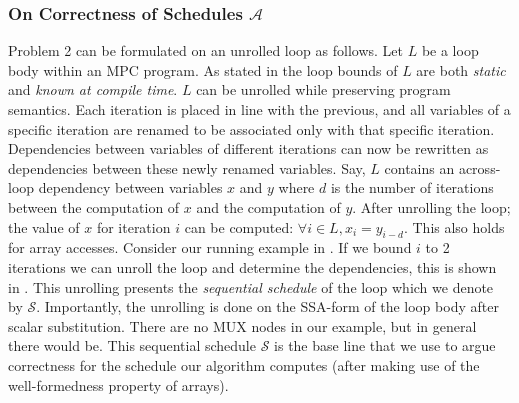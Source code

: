 \subsubsection{On Correctness of Schedules $\mathcal{A}$}

Problem 2 can be formulated on an unrolled loop as follows. 
Let $L$ be a loop body within an MPC program. %
As stated in  the loop bounds of $L$ are both \emph{static} and \emph{known at compile time}. 
$L$ can be unrolled while preserving program semantics. Each iteration is placed in line with
 the previous, and all variables of a specific iteration are renamed to be associated
only with that specific iteration. Dependencies between variables of different iterations can now be rewritten 
as dependencies between these newly renamed variables. Say, $L$ contains an 
across-loop dependency between variables $x$ and $y$ where $d$ is the number of iterations between 
the computation of $x$ and the computation of $y$. After unrolling the loop; the value of $x$ for 
iteration $i$ can be computed: $\forall i \in L, x_{i} = y_{i - d}$. This also holds for array 
accesses. 
Consider our running example in . 
If we bound $i$ to 2 iterations we can unroll the loop and determine the dependencies, this is shown
in . This unrolling presents the \emph{sequential schedule} of the loop which we denote by  $\mathcal{S}$.
Importantly, the unrolling is done on the SSA-form of the loop body after scalar substitution. There are no MUX nodes
in our example, but in general there would be.
This sequential schedule $\mathcal{S}$ is the base line that we use to argue correctness
for the schedule our algorithm computes (after making use of the well-formedness property of arrays). 


